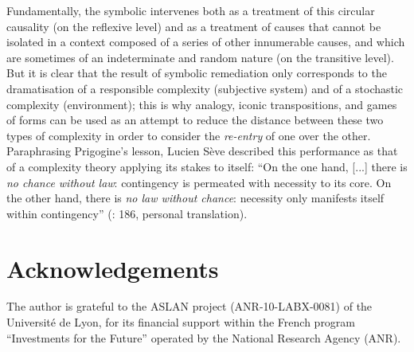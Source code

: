 \documentclass[output=paper]{langscibook}
\begin{document}
Fundamentally, the symbolic intervenes both as a treatment of this circular causality (on the reflexive level) and as a treatment of causes that cannot be isolated in a context composed of a series of other innumerable causes, and which are sometimes of an indeterminate and random nature (on the transitive level). But it is clear that the result of symbolic remediation only corresponds to the dramatisation of a responsible complexity (subjective system) and of a stochastic complexity (environment); this is why analogy, iconic transpositions, and games of forms can be used as an attempt to reduce the distance between these two types of complexity in order to consider the \textit{re-entry} of one over the other. Paraphrasing Prigogine's lesson, Lucien Sève described this performance as that of a complexity theory applying its stakes to itself: “On the one hand, [...] there is \textit{no chance without law}: contingency is permeated with necessity to its core. On the other hand, there is \textit{no law without chance}: necessity only manifests itself within contingency” (\citealt{Sève2005}:  186, personal translation).

\section*{Acknowledgements}
The author is grateful to the ASLAN project (ANR-10-LABX-0081) of the Université de Lyon, for its financial support within the French program “Investments for the Future” operated by the National Research Agency (ANR).

{\sloppy\printbibliography[heading=subbibliography,notkeyword=this]}
\end{document}
